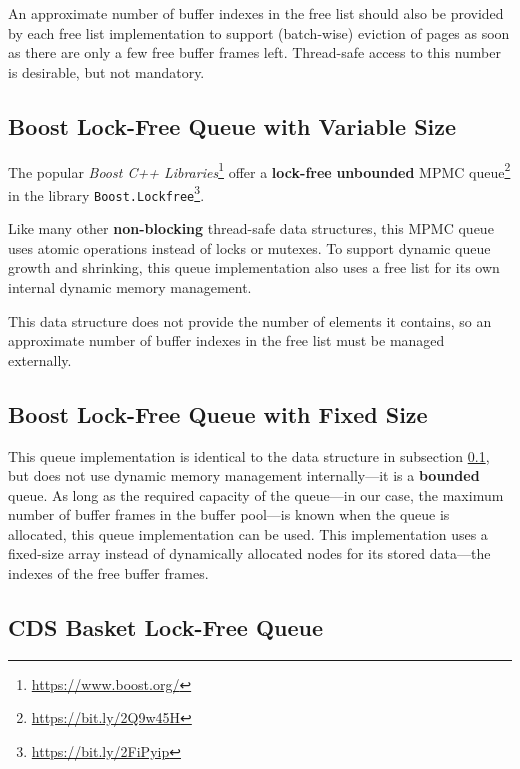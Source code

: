     An approximate number of buffer indexes in the free list should also be provided by each free list implementation to support (batch-wise) eviction of pages as soon as there are only a few free buffer frames left. Thread-safe access to this number is desirable, but not mandatory.

\subsection[Boost Lock-Free Queue with Variable Size]{Boost Lock-Free Queue with Variable Size} \label{subsec:boost}

	The popular \textit{Boost C++ Libraries}\footnote{\url{https://www.boost.org/}} offer a \textbf{lock-free} \textbf{unbounded} MPMC queue\footnote{\url{https://bit.ly/2Q9w45H}} in the library \texttt{Boost.Lockfree}\footnote{\url{https://bit.ly/2FiPyip}}.

    Like many other \textbf{non-blocking} thread-safe data structures, this MPMC queue uses atomic operations instead of locks or mutexes. To support dynamic queue growth and shrinking, this queue implementation also uses a free list for its own internal dynamic memory management.
	
    This data structure does not provide the number of elements it contains, so an approximate number of buffer indexes in the free list must be managed externally.

\subsection[Boost Lock-Free Queue with Fixed Size]{Boost Lock-Free Queue with Fixed Size} \label{subsec:boost-fixed}

	This queue implementation is identical to the data structure in subsection \ref{subsec:boost}, but does not use dynamic memory management internally---it is a \textbf{bounded} queue. As long as the required capacity of the queue---in our case, the maximum number of buffer frames in the buffer pool---is known when the queue is allocated, this queue implementation can be used. This implementation uses a fixed-size array instead of dynamically allocated nodes for its stored data---the indexes of the free buffer frames.

\subsection[CDS BasketQueue]{CDS Basket Lock-Free Queue} \label{subsec:cds-basket}

